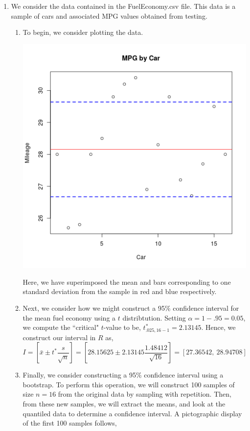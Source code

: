 \documentclass[letterpaper,10pt]{article}
\begin{document}
\begin{enumerate}
\item We consider the data contained in the FuelEconomy.csv file. This data is a sample of cars and associated MPG values obtained from testing.
\begin{enumerate}
\item To begin, we consider plotting the data.
\begin{center}
\includegraphics[scale=.7]{1a.png}
\end{center}
Here, we have superimposed the mean and bars corresponding to one standard deviation from the sample in red and blue respectively.
\item Next, we consider how we might construct a 95\% confidence interval for the mean fuel economy using a $t$ distribtution. Setting $\alpha=1-.95=0.05$, we compute the ``critical" $t$-value to be, $t^*_{.025,16-1}=2.13145$. Hence, we construct our interval in $R$ as,
\[I=\left[\bar{x}\pm t^*\frac{s}{\sqrt{n}}\right]=\left[28.15625\pm 2.13145\frac{1.48412}{\sqrt{16}}\right]=\left[27.36542,\ 28.94708\right]\]
\item Finally, we consider constructing a 95\% confidence interval using a bootstrap. To perform this operation, we will construct 100 samples of size $n=16$ from the original data by sampling with repetition. Then, from these new samples, we will extract the means, and look at the quantiled data to determine a confidence interval. A pictographic display of the first 100 samples follows,

\end{enumerate}
\end{enumerate}
\end{document}
